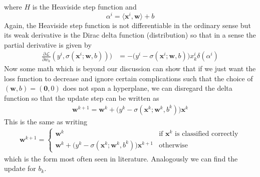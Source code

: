 \documentclass[preprint,12pt,3p]{elsarticle}
\begin{document}
where $H$ is the Heaviside step function and $$\alpha^i=\langle \mathbf{x}^i,\mathbf{w}\rangle+b$$
Again, the Heaviside step function is not differentiable in the ordinary sense but its weak derivative is the Dirac delta function (distribution) so that in a sense the partial derivative is given by
\begin{align*}
    \frac{\partial\mathcal{L}}{\partial w_k}(y^i,\sigma(\mathbf{x}^i;\mathbf{w},b)))
    &=-\big(y^i-\sigma(\mathbf{x}^i;\mathbf{w},b)\big)x^i_k\delta(\alpha^i)
\end{align*}
Now some math which is beyond our discussion can show that if we just want the loss function to decrease and ignore certain complications such that the choice of $(\mathbf{w},b)=(\mathbf{0},0)$ does not span a hyperplane, we can disregard the delta function so that the update step can be written as
\begin{align*}
    \mathbf{w}^{k+1}=\mathbf{w}^{k}+\big(y^{k}-\sigma(\mathbf{x}^k;\mathbf{w}^k,b^k)\big)\mathbf{x}^{k}
\end{align*}
This is the same as writing
\begin{align*}
    \mathbf{w}^{k+1}=\begin{cases}
    \mathbf{w}^{k} &\mbox{if }\mathbf{x}^{k}\mbox{ is classified correctly}\\
    \mathbf{w}^{k}+\big(y^{k}-\sigma(\mathbf{x}^k;\mathbf{w}^k,b^k)\big)\mathbf{x}^{k+1}& \mbox{otherwise}
    \end{cases}
\end{align*}
which is the form most often seen in literature. Analogously we can find the update for $b_k$. 
\end{document}
